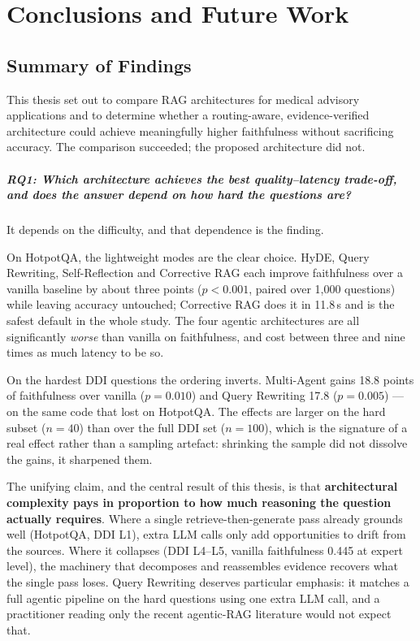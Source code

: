 \chapter{Conclusions and Future Work}
\label{cha:conclusions}

\section{Summary of Findings}
\label{sec:summary}

This thesis set out to compare RAG architectures for medical advisory applications
and to determine whether a routing-aware, evidence-verified architecture could
achieve meaningfully higher faithfulness without sacrificing accuracy.
The comparison succeeded; the proposed architecture did not.

\paragraph{RQ1: Which architecture achieves the best quality--latency trade-off,
and does the answer depend on how hard the questions are?}
It depends on the difficulty, and that dependence is the finding.

On HotpotQA, the lightweight modes are the clear choice.
HyDE, Query Rewriting, Self-Reflection and Corrective RAG each improve
faithfulness over a vanilla baseline by about three points ($p < 0.001$, paired
over 1{,}000 questions) while leaving accuracy untouched; Corrective RAG does it in
11.8\,s and is the safest default in the whole study.
The four agentic architectures are all significantly \emph{worse} than vanilla on
faithfulness, and cost between three and nine times as much latency to be so.

On the hardest DDI questions the ordering inverts.
Multi-Agent gains 18.8 points of faithfulness over vanilla ($p = 0.010$) and
Query Rewriting 17.8 ($p = 0.005$) --- on the same code that lost on HotpotQA.
The effects are larger on the hard subset ($n = 40$) than over the full DDI set
($n = 100$), which is the signature of a real effect rather than a sampling
artefact: shrinking the sample did not dissolve the gains, it sharpened them.

The unifying claim, and the central result of this thesis, is that
\textbf{architectural complexity pays in proportion to how much reasoning the
question actually requires}.
Where a single retrieve-then-generate pass already grounds well (HotpotQA, DDI
L1), extra LLM calls only add opportunities to drift from the sources.
Where it collapses (DDI L4--L5, vanilla faithfulness 0.445 at expert level), the
machinery that decomposes and reassembles evidence recovers what the single pass
loses.
Query Rewriting deserves particular emphasis: it matches a full agentic pipeline
on the hard questions using one extra LLM call, and a practitioner reading only
the recent agentic-RAG literature would not expect that.

